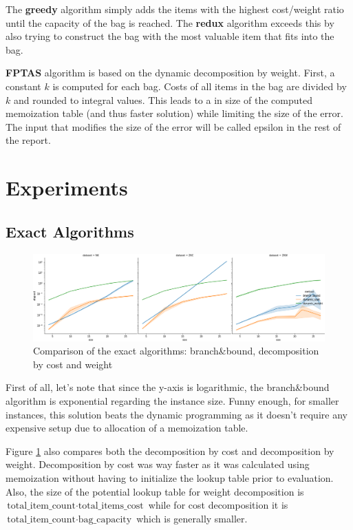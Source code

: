 \documentclass[a4paper,10pt]{article}
\begin{document}
The \textbf{greedy} algorithm simply adds the items with the highest cost/weight ratio until the capacity of the bag is reached. The \textbf{redux} algorithm exceeds this by also trying to construct the bag with the most valuable item that fits into the bag.

\textbf{FPTAS} algorithm is based on the dynamic decomposition by weight. First, a constant $k$ is computed for each bag. Costs of all items in the bag are divided by $k$ and rounded to integral values. This leads to a in size of the computed memoization table (and thus faster solution) while limiting the size of the error. The input that modifies the size of the error will be called epsilon in the rest of the report.

\section{Experiments}

\subsection{Exact Algorithms}

\begin{figure}[!htb]
	\centering
  	\includegraphics[width=\textwidth]{images/exacts_comparison.png}
	\caption{Comparison of the exact algorithms: branch\&bound, decomposition by cost and weight}
	\label{exacts_comparison}
\end{figure}

First of all, let's note that since the y-axis is logarithmic, the branch\&bound algorithm is exponential regarding the instance size. Funny enough, for smaller instances, this solution beats the dynamic programming as it doesn't require any expensive setup due to allocation of a memoization table.

Figure \ref{exacts_comparison} also compares both the decomposition by cost and decomposition by weight. Decomposition by cost was way faster as it was calculated using memoization without having to initialize the lookup table prior to evaluation. Also, the size of the potential lookup table for weight decomposition is $\textrm{total\_item\_count} \cdot \textrm{total\_items\_cost}$ while for cost decomposition it is $\textrm{total\_item\_count} \cdot \textrm{bag\_capacity}$ which is generally smaller. 
\end{document}
